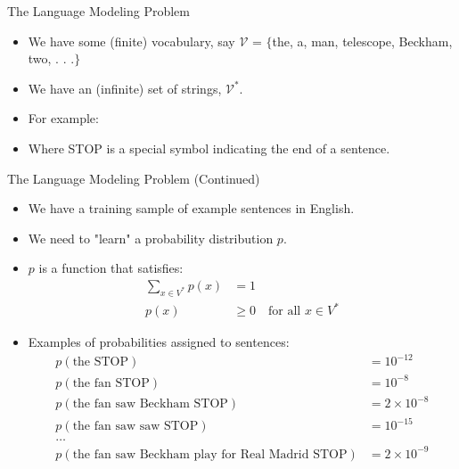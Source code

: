 \documentclass[10pt]{beamer}
\begin{document}
\begin{frame}{The Language Modeling Problem}

\begin{scriptsize}
\begin{itemize}
\item We have some (finite) vocabulary, say $\mathcal{V}$ = $\{$the, a, man, telescope, Beckham, two, . . .$\}$
\item We have an (infinite) set of strings, $\mathcal{V}^*$.
\item For example: 
\item Where STOP is a special symbol indicating the end of a sentence.

\end{itemize}
\end{scriptsize}

\end{frame}


\begin{frame}{The Language Modeling Problem (Continued)}
\begin{scriptsize}
\begin{itemize}
\item We have a training sample of example sentences in English.
\item We need to "learn" a probability distribution $p$.
\item $p$ is a function that satisfies:
\begin{align*}
\sum_{x\in V^*} p(x) &= 1 \\
p(x) &\geq 0 \quad \text{for all } x \in V^*
\end{align*}


\item Examples of probabilities assigned to sentences:
\begin{align*}
p(\text{the STOP}) &= 10^{-12} \\
p(\text{the fan STOP}) &= 10^{-8} \\
p(\text{the fan saw Beckham STOP}) &= 2 \times 10^{-8} \\
p(\text{the fan saw saw STOP}) &= 10^{-15} \\
\ldots \\
p(\text{the fan saw Beckham play for Real Madrid STOP}) &= 2 \times 10^{-9}
\end{align*}
\end{itemize}
\end{scriptsize}
\end{frame}
\end{document}
